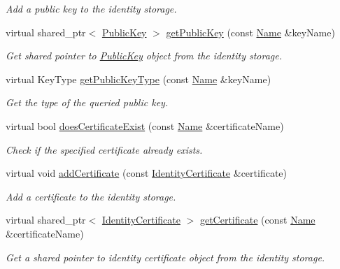 \begin{DoxyCompactItemize}
\begin{DoxyCompactList}\small\item\em Add a public key to the identity storage. \end{DoxyCompactList}\item 
virtual shared\+\_\+ptr$<$ \hyperlink{classndn_1_1PublicKey}{Public\+Key} $>$ \hyperlink{classndn_1_1security_1_1DummyPublicInfo_a7bc8999da7063b8b532d250390849a12}{get\+Public\+Key} (const \hyperlink{classndn_1_1Name}{Name} \&key\+Name)
\begin{DoxyCompactList}\small\item\em Get shared pointer to \hyperlink{classndn_1_1PublicKey}{Public\+Key} object from the identity storage. \end{DoxyCompactList}\item 
virtual Key\+Type \hyperlink{classndn_1_1security_1_1DummyPublicInfo_a722889cc1510939e6c96a582f37042f5}{get\+Public\+Key\+Type} (const \hyperlink{classndn_1_1Name}{Name} \&key\+Name)
\begin{DoxyCompactList}\small\item\em Get the type of the queried public key. \end{DoxyCompactList}\item 
virtual bool \hyperlink{classndn_1_1security_1_1DummyPublicInfo_a84096a2ff0c9620a4e76694ddb177b1c}{does\+Certificate\+Exist} (const \hyperlink{classndn_1_1Name}{Name} \&certificate\+Name)
\begin{DoxyCompactList}\small\item\em Check if the specified certificate already exists. \end{DoxyCompactList}\item 
virtual void \hyperlink{classndn_1_1security_1_1DummyPublicInfo_af67336c09aad4764e3ce731edd979123}{add\+Certificate} (const \hyperlink{classndn_1_1IdentityCertificate}{Identity\+Certificate} \&certificate)
\begin{DoxyCompactList}\small\item\em Add a certificate to the identity storage. \end{DoxyCompactList}\item 
virtual shared\+\_\+ptr$<$ \hyperlink{classndn_1_1IdentityCertificate}{Identity\+Certificate} $>$ \hyperlink{classndn_1_1security_1_1DummyPublicInfo_a5661c7c6c30c2d5fa292036a12406a94}{get\+Certificate} (const \hyperlink{classndn_1_1Name}{Name} \&certificate\+Name)
\begin{DoxyCompactList}\small\item\em Get a shared pointer to identity certificate object from the identity storage. \end{DoxyCompactList}\item 

\end{DoxyCompactItemize}
